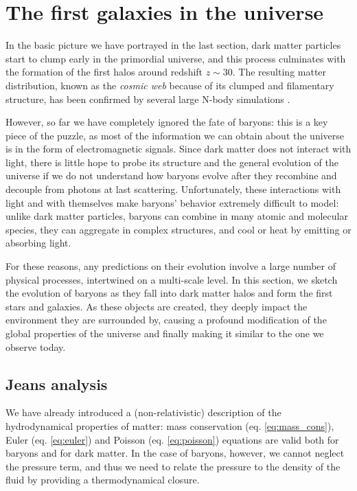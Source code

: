 \section{The first galaxies in the universe} \label{sec:birth_galaxies}


 In the basic picture we have portrayed in the last section, dark matter particles start to clump early in the primordial universe, and this process culminates with the formation of the first halos around redshift $z\sim30$. The resulting matter distribution, known as the \textit{cosmic web} because of its clumped and filamentary structure, has been confirmed by several large N-body simulations \citep[e.g.,][]{Springel:2005nw}. 
 
 However, so far we have completely ignored the fate of baryons: this is a key piece of the puzzle, as most of the information we can obtain about the universe is in the form of electromagnetic signals. Since dark matter does not interact with light, there is little hope to probe its structure and the general evolution of the universe if we do not understand how baryons evolve after they recombine and decouple from photons at last scattering. Unfortunately, these interactions with light and with themselves make baryons' behavior extremely difficult to model: unlike dark matter particles, baryons can combine in many atomic and molecular species, they can aggregate in complex structures, and cool or heat by emitting or absorbing light. 
 
 For these reasons, any predictions on their evolution involve a large number of physical processes, intertwined on a multi-scale level. In this section, we sketch the evolution of baryons as they fall into dark matter halos and form the first stars and galaxies. As these objects are created, they deeply impact the environment they are surrounded by, causing a profound modification of the global properties of the universe and finally making it similar to the one we observe today.
 
 \subsection{Jeans analysis} \label{sec:jeans}
 
 We have already introduced a (non-relativistic) description of the hydrodynamical properties of matter: mass conservation (eq. \ref{eq:mass_cons}), Euler (eq. \ref{eq:euler}) and Poisson (eq. \ref{eq:poisson}) equations are valid both for baryons and for dark matter. In the case of baryons, however, we cannot neglect the pressure term, and thus we need to relate the pressure to the density of the fluid by providing a thermodynamical closure.
 
